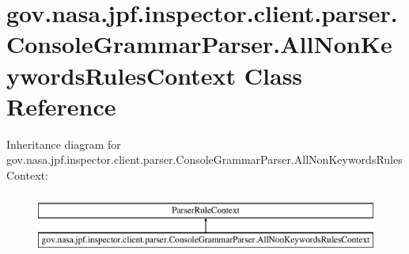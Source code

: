 \hypertarget{classgov_1_1nasa_1_1jpf_1_1inspector_1_1client_1_1parser_1_1_console_grammar_parser_1_1_all_non_keywords_rules_context}{}\section{gov.\+nasa.\+jpf.\+inspector.\+client.\+parser.\+Console\+Grammar\+Parser.\+All\+Non\+Keywords\+Rules\+Context Class Reference}
\label{classgov_1_1nasa_1_1jpf_1_1inspector_1_1client_1_1parser_1_1_console_grammar_parser_1_1_all_non_keywords_rules_context}
Inheritance diagram for gov.\+nasa.\+jpf.\+inspector.\+client.\+parser.\+Console\+Grammar\+Parser.\+All\+Non\+Keywords\+Rules\+Context\+:\begin{figure}[H]
\begin{center}
\leavevmode
\includegraphics[height=2.000000cm]{classgov_1_1nasa_1_1jpf_1_1inspector_1_1client_1_1parser_1_1_console_grammar_parser_1_1_all_non_keywords_rules_context}
\end{center}
\end{figure}
